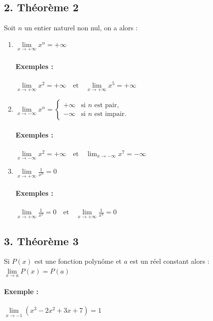 \documentclass[12pt,a4paper]{article}
\begin{document}
\subsection*{\color{myred} 2. Théorème 2 }
Soit \( n \) un entier naturel non nul, on a alors :

\begin{enumerate}[label=\roman*.]
    \item 
    $
    \lim\limits_{x \to +\infty} x^n = +\infty
    $
    \paragraph{Exemples :}
    $    \lim\limits_{x \to +\infty} x^2 = +\infty \quad \text{et} \quad \lim\limits_{x \to +\infty} x^5 = +\infty$

    \item 
     $\lim\limits_{x \to -\infty} x^n = 
    \begin{cases}
        +\infty & \text{si } n \text{ est pair}, \\
        -\infty & \text{si } n \text{ est impair}.
    \end{cases}$
    \paragraph{Exemples :}
$    \lim\limits_{x \to -\infty} x^2 = +\infty \quad \text{et} \quad \lim_{x \to -\infty} x^7 = -\infty$

    \item 
$    \lim\limits_{x \to +\infty} \frac{1}{x^n} = 0$
    \paragraph{Exemples :}
$    \lim\limits_{x \to +\infty} \frac{1}{x^2} = 0 \quad \text{et} \quad \lim\limits_{x \to +\infty} \frac{1}{x^4} = 0$
\end{enumerate}

\subsection*{\color{myred} 3. Théorème 3 }
Si \( P(x) \) est une fonction polynôme et \( a \) est un réel constant alors :
$\lim\limits_{x \to a} P(x) = P(a)$

\paragraph{Exemple :}
$\lim\limits_{x \to -1} (x^3 - 2x^2 + 3x + 7) = 1$
\end{document}
